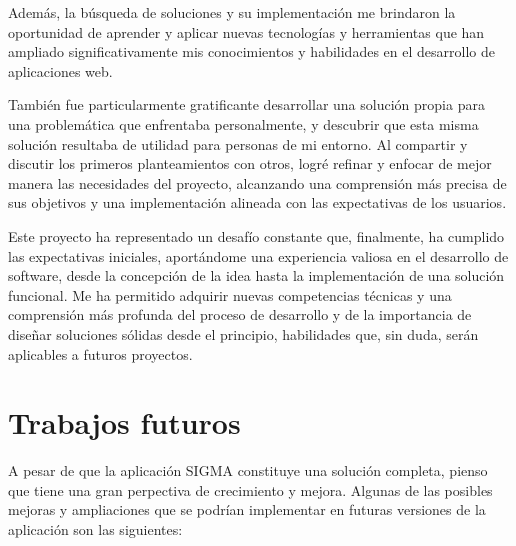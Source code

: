 Además, la búsqueda de soluciones y su implementación me brindaron la oportunidad de aprender y aplicar nuevas tecnologías y herramientas que han ampliado significativamente mis conocimientos y habilidades en el desarrollo de aplicaciones web.

También fue particularmente gratificante desarrollar una solución propia para una problemática que enfrentaba personalmente, y descubrir que esta misma solución resultaba de utilidad para personas de mi entorno. Al compartir y discutir los primeros planteamientos con otros, logré refinar y enfocar de mejor manera las necesidades del proyecto, alcanzando una comprensión más precisa de sus objetivos y una implementación alineada con las expectativas de los usuarios.

Este proyecto ha representado un desafío constante que, finalmente, ha cumplido las expectativas iniciales, aportándome una experiencia valiosa en el desarrollo de software, desde la concepción de la idea hasta la implementación de una solución funcional. Me ha permitido adquirir nuevas competencias técnicas y una comprensión más profunda del proceso de desarrollo y de la importancia de diseñar soluciones sólidas desde el principio, habilidades que, sin duda, serán aplicables a futuros proyectos.


\section{Trabajos futuros}
A pesar de que la aplicación SIGMA constituye una solución completa, pienso que tiene una gran perpectiva de crecimiento y mejora. Algunas de las posibles mejoras y ampliaciones que se podrían implementar en futuras versiones de la aplicación son las siguientes:

